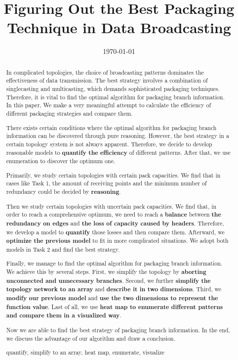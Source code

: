 \documentclass{mcmthesis}
\begin{document}
\linespread{0.8} %
\setlength{\parskip}{0.7\baselineskip} %
\title{Figuring Out the Best Packaging Technique in Data Broadcasting}

\date{\today}
\begin{abstract}

	In complicated topologies, the choice of broadcasting patterns dominates the effectiveness of data transmission. The best strategy involves a combination of singlecasting and multicasting, which demands sophisticated packaging techniques. Therefore, it is vital to find the optimal algorithm for packaging branch information. In this paper, We make a very meaningful attempt to calculate the efficiency of different packaging strategies and compare them.

	There exists certain conditions where the optimal algorithm for packaging branch information can be discovered through pure reasoning. However, the best strategy in a certain topology system is not always apparent. Therefore, we decide to develop reasonable models to \textbf{quantify the efficiency} of different patterns. After that, we use enumeration to discover the optimum one.

	Primarily, we study certain topologies with certain pack capacities. We find that in cases like Task 1, the amount of receiving points and the minimum number of redundancy could be decided by \textbf{reasoning}.
	
	Then we study certain topologies with uncertain pack capacities. We find that, in order to reach a comprehensive optimum, we need to reach a \textbf{balance} between \textbf{the redundancy on edges} and \textbf{the loss of capacity caused by headers}. Therefore, we develop a model to \textbf{quantify} those losses and then compare them. Afterward, we \textbf{optimize the previous model} to fit in more complicated situations. We adopt both models in Task 2 and find the best strategy.
	
	Finally, we manage to find the optimal algorithm for packaging branch information. We achieve this by several steps. First, we simplify the topology by \textbf{aborting unconnected and unnecessary branches}. Second, we further \textbf{simplify the topology network to an array} and \textbf{describe it in two dimensions}. Third, we \textbf{modify our previous model} and \textbf{use the two dimensions to represent the function value}. Last of all, we use \textbf{heat map to enumerate different patterns and compare them in a visualized way}. 

	Now we are able to find the best strategy of packaging branch information. In the end, we discuss the advantage of our algorithm and draw a conclusion. 
	


	\begin{keywords}
		quantify, simplify to an array, heat map, enumerate, visualize
	\end{keywords}
\end{abstract}
\end{document}
